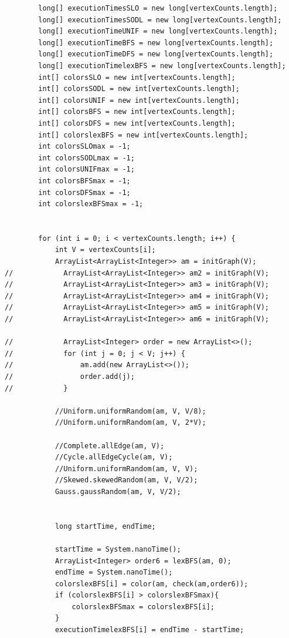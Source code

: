 \documentclass{article}
\begin{document}
\begin{verbatim}
        long[] executionTimesSLO = new long[vertexCounts.length];
        long[] executionTimesSODL = new long[vertexCounts.length];
        long[] executionTimeUNIF = new long[vertexCounts.length];
        long[] executionTimeBFS = new long[vertexCounts.length];
        long[] executionTimeDFS = new long[vertexCounts.length];
        long[] executionTimelexBFS = new long[vertexCounts.length];
        int[] colorsSLO = new int[vertexCounts.length];
        int[] colorsSODL = new int[vertexCounts.length];
        int[] colorsUNIF = new int[vertexCounts.length];
        int[] colorsBFS = new int[vertexCounts.length];
        int[] colorsDFS = new int[vertexCounts.length];
        int[] colorslexBFS = new int[vertexCounts.length];
        int colorsSLOmax = -1;
        int colorsSODLmax = -1;
        int colorsUNIFmax = -1;
        int colorsBFSmax = -1;
        int colorsDFSmax = -1;
        int colorslexBFSmax = -1;


        for (int i = 0; i < vertexCounts.length; i++) {
            int V = vertexCounts[i];
            ArrayList<ArrayList<Integer>> am = initGraph(V);
//            ArrayList<ArrayList<Integer>> am2 = initGraph(V);
//            ArrayList<ArrayList<Integer>> am3 = initGraph(V);
//            ArrayList<ArrayList<Integer>> am4 = initGraph(V);
//            ArrayList<ArrayList<Integer>> am5 = initGraph(V);
//            ArrayList<ArrayList<Integer>> am6 = initGraph(V);

//            ArrayList<Integer> order = new ArrayList<>();
//            for (int j = 0; j < V; j++) {
//                am.add(new ArrayList<>());
//                order.add(j);
//            }

            //Uniform.uniformRandom(am, V, V/8);
            //Uniform.uniformRandom(am, V, 2*V);

            //Complete.allEdge(am, V);
            //Cycle.allEdgeCycle(am, V);
            //Uniform.uniformRandom(am, V, V);
            //Skewed.skewedRandom(am, V, V/2);
            Gauss.gaussRandom(am, V, V/2);


            long startTime, endTime;

            startTime = System.nanoTime();
            ArrayList<Integer> order6 = lexBFS(am, 0);
            endTime = System.nanoTime();
            colorslexBFS[i] = color(am, check(am,order6));
            if (colorslexBFS[i] > colorslexBFSmax){
                colorslexBFSmax = colorslexBFS[i];
            }
            executionTimelexBFS[i] = endTime - startTime;



\end{verbatim}
\end{document}
